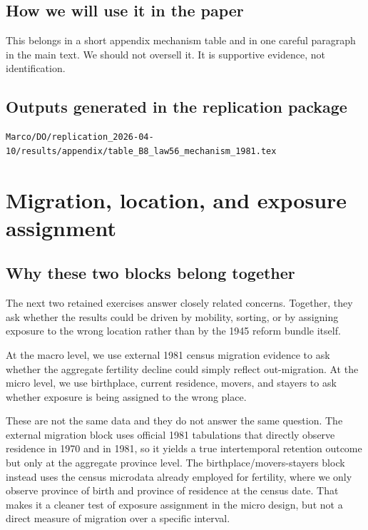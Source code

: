\documentclass[11pt]{article}
\begin{document}
\subsection*{How we will use it in the paper}

This belongs in a short appendix mechanism table and in one careful paragraph in the main text. We should not oversell it. It is supportive evidence, not identification.

\subsection*{Outputs generated in the replication package}

\begin{verbatim}
Marco/DO/replication_2026-04-10/results/appendix/table_B8_law56_mechanism_1981.tex
\end{verbatim}

\section{Migration, location, and exposure assignment}\label{sec:migration}

\subsection*{Why these two blocks belong together}

The next two retained exercises answer closely related concerns. Together, they ask whether the results could be driven by mobility, sorting, or by assigning exposure to the wrong location rather than by the 1945 reform bundle itself.

At the macro level, we use external 1981 census migration evidence to ask whether the aggregate fertility decline could simply reflect out-migration. At the micro level, we use birthplace, current residence, movers, and stayers to ask whether exposure is being assigned to the wrong place.

These are not the same data and they do not answer the same question. The external migration block uses official 1981 tabulations that directly observe residence in 1970 and in 1981, so it yields a true intertemporal retention outcome but only at the aggregate province level. The birthplace/movers-stayers block instead uses the census microdata already employed for fertility, where we only observe province of birth and province of residence at the census date. That makes it a cleaner test of exposure assignment in the micro design, but not a direct measure of migration over a specific interval.
\end{document}

